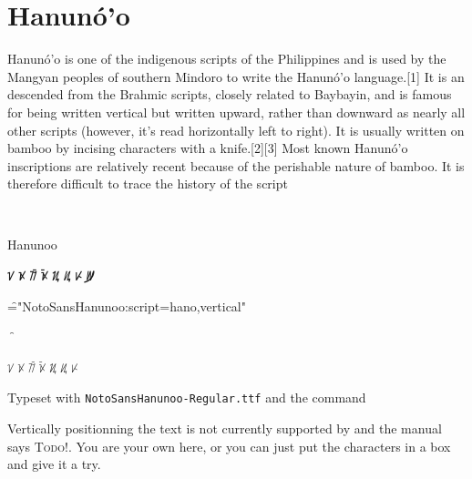 \section{Hanunó’o}

Hanunó’o is one of the indigenous scripts of the Philippines and is used by the Mangyan peoples of southern Mindoro to write the Hanunó'o language.[1] 
It is an  descended from the Brahmic scripts, closely related to Baybayin, and is famous for being written vertical but written upward, rather than downward as nearly all other scripts (however, it's read horizontally left to right). It is usually written on bamboo by incising characters with a knife.[2][3] Most known Hanunó'o inscriptions are relatively recent because of the perishable nature of bamboo. It is therefore difficult to trace the history of the script

\newfontfamily{}
^^A%
\begin{scriptexample}[width=2cm]{Hanunoo}
\hanunoo

{\Large\bfseries
\obeylines
ᜠ 
ᜫ
ᜨᜲ
ᜫᜲ
ᜰ
ᜮ
ᜥ
ᜦ᜴}


\font\f="NotoSansHanunoo:script=hano,vertical"

^^A \f{}


ᜠ 
ᜫ
ᜨᜲ
ᜫᜲ
ᜰ
ᜮ
ᜥ


Typeset with \texttt{NotoSansHanunoo-Regular.ttf} and the command \cmd{\hanunoo}
\end{scriptexample}

Vertically positionning the text is not currently supported by  and the manual says \textsc{Todo!}. You are your own here, or you can just put the characters in a box and give it a try.

